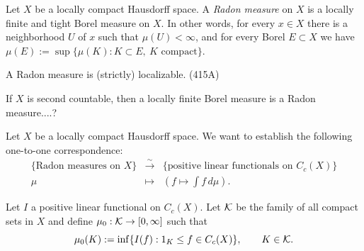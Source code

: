 \documentclass{../../large}
\begin{document}
\begin{prb}
Let $X$ be a locally compact Hausdorff space.
A \emph{Radon measure} on $X$ is a locally finite and tight Borel measure on $X$.
In other words, for every $x\in X$ there is a neighborhood $U$ of $x$ such that $\mu(U)<\infty$, and for every Borel $E\subset X$ we have $\mu(E):=\sup\{\mu(K):K\subset E,\ K\text{ compact}\}$.

\begin{parts}
\item A Radon measure is (strictly) localizable. (415A)
\item If $X$ is second countable, then a locally finite Borel measure is a Radon measure....?
\item
\end{parts}
\end{prb}

\begin{prb}
Let $X$ be a locally compact Hausdorff space.
We want to establish the following one-to-one correspondence:
\[\begin{array}{ccc}
\{\text{Radon measures on $X$}\} & \xrightarrow{\sim} & \{\text{positive linear functionals on $C_c(X)$}\}\\
\mu & \mapsto & (f\mapsto\int f\,d\mu).
\end{array}\]
\end{prb}
\begin{pf}
Let $I$ a positive linear functional on $C_c(X)$.
Let $\mathcal{K}$ be the family of all compact sets in $X$ and define $\mu_0:\mathcal{K}\to[0,\infty]$ such that
\[\mu_0(K):=\inf\{I(f):1_K\le f\in C_c(X)\},\qquad K\in\mathcal{K}.\]
\end{pf}
\end{document}
